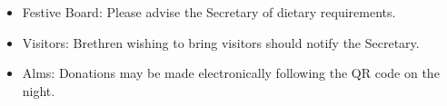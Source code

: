 \begin{itemize}[leftmargin=*]
\item Festive Board: Please advise the Secretary of dietary requirements.
\item Visitors: Brethren wishing to bring visitors should notify the Secretary.
\item Alms: Donations may be made electronically following the QR code on the night.
\end{itemize}
